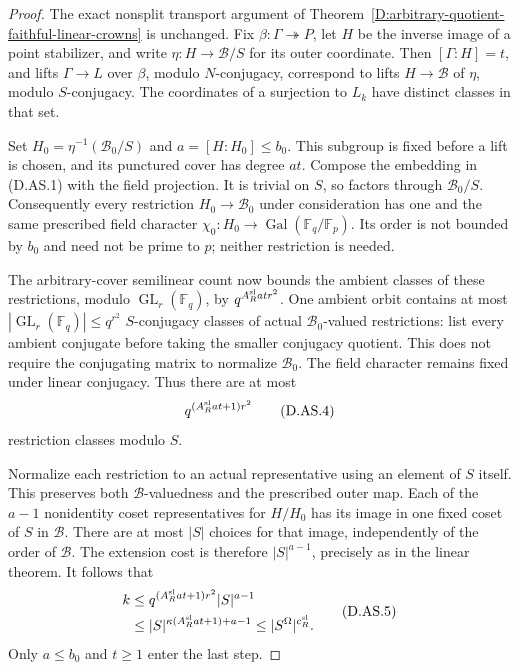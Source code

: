 \begin{proof}
The exact nonsplit transport argument of
Theorem~\ref{D:arbitrary-quotient-faithful-linear-crowns}
is unchanged. Fix $\beta:\Gamma\twoheadrightarrow P$,
let $H$ be the inverse image of a point stabilizer, and
write $\eta:H\to\mathcal B/S$ for its outer coordinate.
Then $[\Gamma:H]=t$, and lifts $\Gamma\to L$ over
$\beta$, modulo $N$-conjugacy, correspond to lifts
$H\to\mathcal B$ of $\eta$, modulo $S$-conjugacy.
The coordinates of a surjection to $L_k$ have distinct
classes in that set.

Set $H_0=\eta^{-1}(\mathcal B_0/S)$ and
$a=[H:H_0]\le b_0$. This subgroup is fixed before a
lift is chosen, and its punctured cover has degree $at$.
Compose the embedding in (D.AS.1) with the field projection.
It is trivial on $S$, so factors through
$\mathcal B_0/S$. Consequently every restriction
$H_0\to\mathcal B_0$ under consideration has one and
the same prescribed field character
$\chi_0:H_0\to\operatorname{Gal}(\mathbb F_q/\mathbb F_p)$.
Its order is not bounded by $b_0$ and need not be prime
to $p$; neither restriction is needed.

The arbitrary-cover semilinear count now bounds the
ambient classes of these restrictions, modulo
$\operatorname{GL}_r(\mathbb F_q)$, by
$q^{A_R^{\rm sl}at r^2}$. One ambient orbit contains
at most $|\operatorname{GL}_r(\mathbb F_q)|\le q^{r^2}$
$S$-conjugacy classes of actual $\mathcal B_0$-valued
restrictions: list every ambient conjugate before taking
the smaller conjugacy quotient. This does not require
the conjugating matrix to normalize $\mathcal B_0$.
The field character remains fixed under linear conjugacy.
Thus there are at most
\[
                     q^{(A_R^{\rm sl}at+1)r^2}           \tag{D.AS.4}
\]
restriction classes modulo $S$.

Normalize each restriction to an actual representative
using an element of $S$ itself. This preserves both
$\mathcal B$-valuedness and the prescribed outer map.
Each of the $a-1$ nonidentity coset representatives for
$H/H_0$ has its image in one fixed coset of $S$ in
$\mathcal B$. There are at most $|S|$ choices for that
image, independently of the order of $\mathcal B$.
The extension cost is therefore $|S|^{a-1}$, precisely
as in the linear theorem. It follows that
\[
 \begin{split}
 k&\le q^{(A_R^{\rm sl}at+1)r^2}|S|^{a-1}\\
  &\le |S|^{\kappa(A_R^{\rm sl}at+1)+a-1}
   \le |S^\Omega|^{c_R^{\rm sl}}.
 \end{split}                                               \tag{D.AS.5}
\]
Only $a\le b_0$ and $t\ge1$ enter the last step.


\end{proof}
